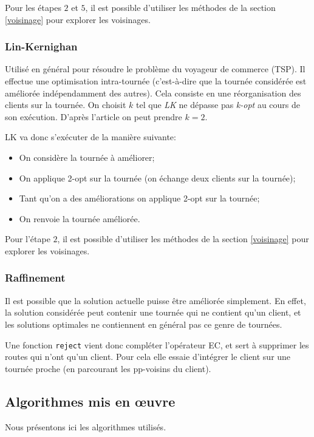 \documentclass[a4paper,11pt]{article}%
\begin{document}
Pour les étapes $2$ et $5$, il est possible d'utiliser les méthodes de la section \ref{voisinage} pour explorer les voisinages.

\subsubsection{Lin-Kernighan}

Utilisé en général pour résoudre le problème du voyageur de commerce (TSP). Il effectue une optimisation intra-tournée (c'est-à-dire que la tournée considérée est améliorée indépendamment des autres). Cela consiste en une réorganisation des clients sur la tournée. On choisit $k$ tel que \emph{LK} ne dépasse pas \emph{k-opt} au cours de son exécution. D'après l'article on peut prendre $k = 2$.

LK va donc s'exécuter de la manière suivante:
\begin{itemize}
\item On considère la tournée à améliorer;
\item On applique 2-opt sur la tournée (on échange deux clients sur la tournée);
\item Tant qu'on a des améliorations on applique 2-opt sur la tournée;
\item On renvoie la tournée améliorée. \\
\end{itemize}

Pour l'étape $2$, il est possible d'utiliser les méthodes de la section \ref{voisinage} pour explorer les voisinages.

\subsubsection{Raffinement}

Il est possible que la solution actuelle puisse être améliorée simplement. En effet, la solution considérée peut contenir une tournée qui ne contient qu'un client, et les solutions optimales ne contiennent en général pas ce genre de tournées.  

Une fonction \lstinline|reject| vient donc compléter l'opérateur EC, et sert à supprimer les routes qui n'ont qu'un client. Pour cela elle essaie d'intégrer le client sur une tournée proche (en parcourant les pp-voisins du client).

\subsection{Algorithmes mis en œuvre}
Nous présentons ici les algorithmes utilisés.
\end{document}
